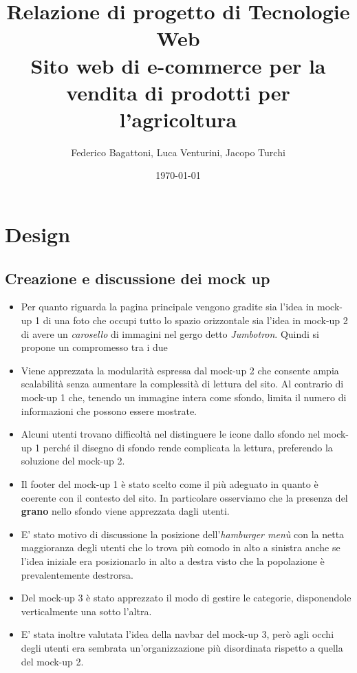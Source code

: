 \documentclass{report}
\title{
    Relazione di progetto di Tecnologie Web\\
    \large Sito web di e-commerce per la vendita di prodotti per l'agricoltura
}
\author{Federico Bagattoni, Luca Venturini, Jacopo Turchi}
\date{\today}
\begin{document}
\maketitle

\tableofcontents

\chapter{Design}

\section{Creazione e discussione dei mock up}



\begin{itemize}
    \item {
        Per quanto riguarda la pagina principale vengono gradite sia l'idea in mock-up 1 di una foto che occupi tutto lo spazio orizzontale sia l'idea in mock-up 2 di avere un \textit{carosello} di immagini nel gergo detto \textit{Jumbotron}. Quindi si propone un compromesso tra i due
    }
    \item {
        Viene apprezzata la modularità espressa dal mock-up 2 che consente ampia scalabilità senza aumentare la complessità di lettura del sito. Al contrario di mock-up 1 che, tenendo un immagine intera come sfondo, limita il numero di informazioni che possono essere mostrate.
    }
    \item {
        Alcuni utenti trovano difficoltà nel distinguere le icone dallo sfondo nel mock-up 1 perché il disegno di sfondo rende complicata la lettura, preferendo la soluzione del mock-up 2.
    }
    \item {
        Il footer del mock-up 1 è stato scelto come il più adeguato in quanto è coerente con il contesto del sito. In particolare osserviamo che la presenza del \textbf{grano} nello sfondo viene apprezzata dagli utenti.
    }
    \item {
        E' stato motivo di discussione la posizione dell'\textit{hamburger menù} con la netta maggioranza degli utenti che lo trova più comodo in alto a sinistra anche se l'idea iniziale era posizionarlo in alto a destra visto che la popolazione è prevalentemente destrorsa.
    }
    \item {
        Del mock-up 3 è stato apprezzato il modo di gestire le categorie, disponendole verticalmente una sotto l'altra.
    }
    \item {
        E' stata inoltre valutata l'idea della navbar del mock-up 3, però agli occhi degli utenti era sembrata un'organizzazione più disordinata rispetto a quella del mock-up 2.
    }
\end{itemize}
\end{document}
